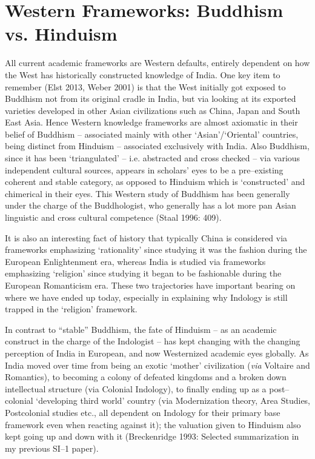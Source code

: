 \section*{Western Frameworks: Buddhism vs. Hinduism}

All current academic frameworks are Western defaults, entirely dependent on how the West has historically constructed knowledge of India. One key item to remember (Elst 2013, Weber 2001) is that the West initially got exposed to Buddhism not from its original cradle in India, but via looking at its exported varieties developed in other Asian civilizations such as China, Japan and South East Asia. Hence Western knowledge frameworks are almost axiomatic in their belief of Buddhism – associated mainly with other ‘Asian’/‘Oriental’ countries, being distinct from Hinduism – associated exclusively with India. Also Buddhism, since it has been ‘triangulated’ – i.e. abstracted and cross checked – via various independent cultural sources, appears in scholars’ eyes to be a pre–existing coherent and stable category, as opposed to Hinduism which is ‘constructed’ and chimerical in their eyes. This Western study of Buddhism has been generally under the charge of the Buddhologist, who generally has a lot more pan Asian linguistic and cross cultural competence (Staal 1996: 409).

It is also an interesting fact of history that typically China is considered via frameworks emphasizing ‘rationality’ since studying it was the fashion during the European Enlightenment era, whereas India is studied via frameworks emphasizing ‘religion’ since studying it began to be fashionable during the European Romanticism era. These two trajectories have important bearing on where we have ended up today, especially in explaining why Indology is still trapped in the ‘religion’ framework.

In contrast to “stable” Buddhism, the fate of Hinduism – as an academic construct in the charge of the Indologist – has kept changing with the changing perception of India in European, and now Westernized academic eyes globally. As India moved over time from being an exotic ‘mother’ civilization (\textit{via} Voltaire and Romantics), to becoming a colony of defeated kingdoms and a broken down intellectual structure (via Colonial Indology), to finally ending up as a post–colonial ‘developing third world’ country (via Modernization theory, Area Studies, Postcolonial studies etc., all dependent on Indology for their primary base framework even when reacting against it); the valuation given to Hinduism also kept going up and down with it (Breckenridge 1993: Selected summarization in my previous SI–1 paper).

